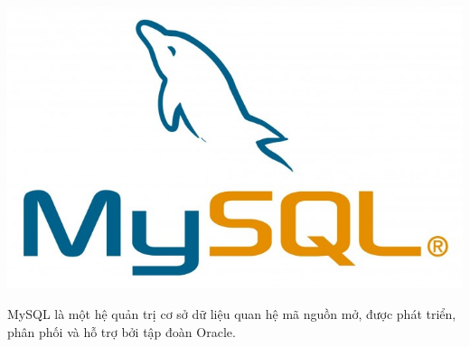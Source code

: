 \begin{center}
  \captionsetup{type=figure}
    \includegraphics[scale=0.5]{img/mysql.jpg}
\end{center}

MySQL là một hệ quản trị cơ sở dữ liệu quan hệ mã nguồn mở, được phát triển, phân phối và hỗ trợ bởi tập đoàn Oracle.\\

